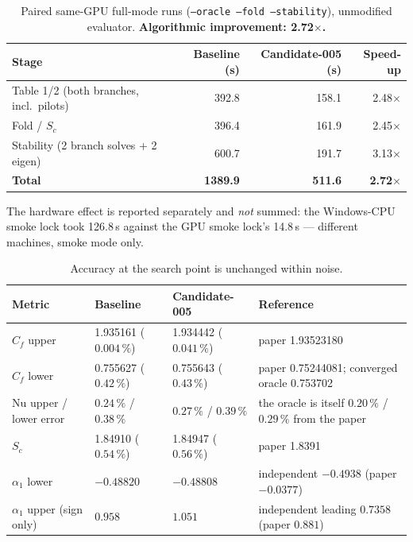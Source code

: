 \documentclass[11pt,a4paper]{article}
\newcommand{\code}[1]{\texttt{\small #1}}
\newcommand{\pct}{\,\%}
\begin{document}
\begin{table}[ht]
\centering
\caption{Paired same-GPU full-mode runs (\code{--oracle --fold --stability}), unmodified
evaluator. \textbf{Algorithmic improvement: 2.72$\times$.}}
\label{tab:paired}
\small
\begin{tabular}{@{}lrrr@{}}
\toprule
\textbf{Stage} & \textbf{Baseline (s)} & \textbf{Candidate-005 (s)} & \textbf{Speed-up} \\
\midrule
Table 1/2 (both branches, incl.\ pilots) & 392.8 & 158.1 & 2.48$\times$ \\
Fold / $S_c$                             & 396.4 & 161.9 & 2.45$\times$ \\
Stability (2 branch solves + 2 eigen)    & 600.7 & 191.7 & 3.13$\times$ \\
\midrule
\textbf{Total}                           & \textbf{1389.9} & \textbf{511.6} & \textbf{2.72$\times$} \\
\bottomrule
\end{tabular}
\end{table}

\noindent The hardware effect is reported separately and \emph{not} summed: the Windows-CPU
smoke lock took 126.8\,s against the GPU smoke lock's 14.8\,s --- different machines, smoke
mode only.

\begin{table}[ht]
\centering
\caption{Accuracy at the search point is unchanged within noise.}
\label{tab:acc005}
\small
\begin{tabular}{@{}lllp{5.2cm}@{}}
\toprule
\textbf{Metric} & \textbf{Baseline} & \textbf{Candidate-005} & \textbf{Reference} \\
\midrule
$C_f$ upper & 1.935161 ($0.004\pct$) & 1.934442 ($0.041\pct$) & paper 1.93523180 \\
$C_f$ lower & 0.755627 ($0.42\pct$)  & 0.755643 ($0.43\pct$)  & paper 0.75244081; converged oracle 0.753702 \\
$\mathrm{Nu}$ upper / lower error & $0.24\pct$ / $0.38\pct$ & $0.27\pct$ / $0.39\pct$ & the oracle is itself $0.20\pct$ / $0.29\pct$ from the paper \\
$S_c$ & 1.84910 ($0.54\pct$) & 1.84947 ($0.56\pct$) & paper 1.8391 \\
$\alpha_1$ lower & $-0.48820$ & $-0.48808$ & independent $-0.4938$ (paper $-0.0377$) \\
$\alpha_1$ upper (sign only) & $0.958$ & $1.051$ & independent leading $0.7358$ (paper $0.881$) \\
\bottomrule
\end{tabular}
\end{table}
\end{document}
